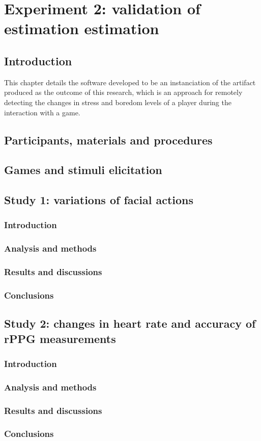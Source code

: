 \chapter{Experiment 2: validation of estimation estimation}
\label{ch:experiment2}

\section{Introduction}
This chapter details the software developed to be an instanciation of the artifact produced as the outcome of this research, which is an approach for remotely detecting the changes in stress and boredom levels of a player during the interaction with a game.

\section{Participants, materials and procedures}
\section{Games and stimuli elicitation}
\section{Study 1: variations of facial actions}
  \subsection{Introduction}
  \subsection{Analysis and methods}
  \subsection{Results and discussions}
  \subsection{Conclusions}
\section{Study 2: changes in heart rate and accuracy of rPPG measurements}
  \subsection{Introduction}
  \subsection{Analysis and methods}
  \subsection{Results and discussions}
  \subsection{Conclusions}
